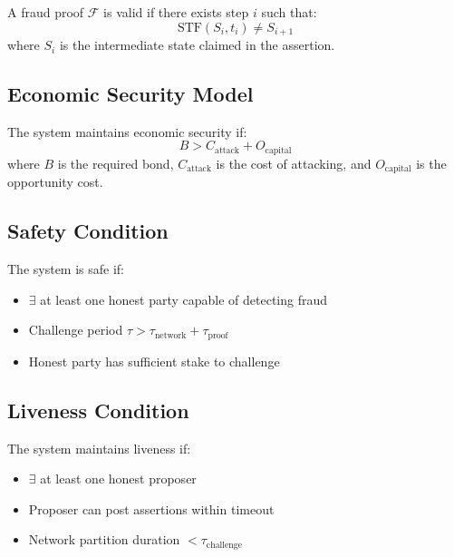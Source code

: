 \begin{definition}
A fraud proof $\mathcal{F}$ is valid if there exists step $i$ such that:
\begin{equation}
\text{STF}(S_i, t_i) \neq S_{i+1}
\end{equation}
where $S_i$ is the intermediate state claimed in the assertion.
\end{definition}

\subsection{Economic Security Model}

\begin{theorem}
The system maintains economic security if:
\begin{equation}
B > C_{\text{attack}} + O_{\text{capital}}
\end{equation}
where $B$ is the required bond, $C_{\text{attack}}$ is the cost of attacking, and $O_{\text{capital}}$ is the opportunity cost.
\end{theorem}

\subsection{Safety Condition}

\begin{theorem}[Safety]
The system is safe if:
\begin{itemize}
    \item $\exists$ at least one honest party capable of detecting fraud
    \item Challenge period $\tau > \tau_{\text{network}} + \tau_{\text{proof}}$
    \item Honest party has sufficient stake to challenge
\end{itemize}
\end{theorem}

\subsection{Liveness Condition}

\begin{theorem}[Liveness]
The system maintains liveness if:
\begin{itemize}
    \item $\exists$ at least one honest proposer
    \item Proposer can post assertions within timeout
    \item Network partition duration $< \tau_{\text{challenge}}$
\end{itemize}
\end{theorem}

